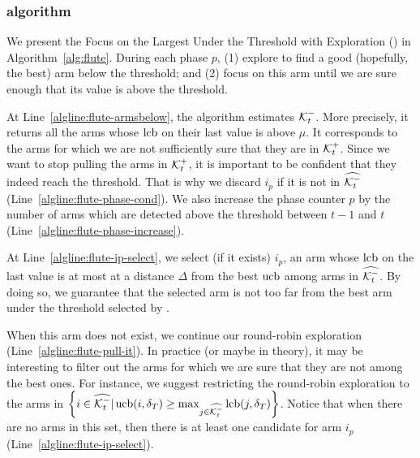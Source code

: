 \subsubsection{{\FLUTE} algorithm}
We present the Focus on the Largest Under the Threshold with Exploration (\FLUTE) in Algorithm~\ref{alg:flute}. During each phase $p$, \FLUTE (1) explore to find a good (hopefully, the best) arm below the threshold; and (2) focus on this arm until we are sure enough that its value is above the threshold. 

At Line~\ref{algline:flute-armsbelow}, the algorithm estimates $\mathcal{K}_t^-$. More precisely, it returns all the arms whose $\normalfont\operatorname{lcb}$ on their last value is above $\mu$. It corresponds to the arms for which we are not sufficiently sure that they are in $\mathcal{K}_t^+$. Since we want to stop pulling the arms in $\mathcal{K}_t^+$, it is important to be confident that they indeed reach the threshold. That is why we discard $i_p$ if it is not in $\widehat{\mathcal{K}_t^-}$ (Line~\ref{algline:flute-phase-cond}). We also increase the phase counter $p$ by the number of arms which are detected above the threshold between $t-1$ and $t$ (Line~\ref{algline:flute-phase-increase}).

At Line~\ref{algline:flute-ip-select}, we select (if it exists) $i_p$, an arm whose $\normalfont\operatorname{lcb}$ on the last value is at most at a distance $\Delta$ from the best $\normalfont\operatorname{ucb}$  among arms in $\widehat{\mathcal{K}_t^-}$. By doing so, we guarantee that the selected arm is not too far from the best arm under the threshold selected by \FLUT.

When this arm does not exist, we continue our round-robin exploration (Line~\ref{algline:flute-pull-it}). In practice (or maybe in theory), it may be interesting to filter out the arms for which we are sure that they are not among the best ones. For instance, we suggest restricting the round-robin exploration to the arms in $\left\{i \in \widehat{\mathcal{K}_t^-} | \normalfont\operatorname{ucb}(i,\delta_T) \geq \max_{j \in \widehat{\mathcal{K}_t^-}} \normalfont\operatorname{lcb}(j, \delta_T )\right\}$. Notice that when there are no arms in this set, then there is at least one candidate for arm $i_p$ (Line~\ref{algline:flute-ip-select}).

